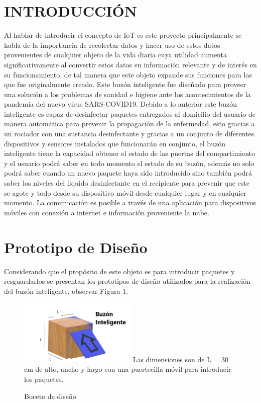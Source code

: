 \documentclass[osajnl,twocolumn,showpacs,superscriptaddress,10pt]{revtex4-1}
\begin{document}
\section{INTRODUCCIÓN}
Al hablar de introducir el concepto de IoT es este proyecto principalmente se habla de la importancia de recolectar datos y hacer uso de estos datos provenientes de cualquier objeto de la vida diaria cuya utilidad aumenta significativamente al convertir estos datos en información relevante y de interés en su funcionamiento, de tal manera que este objeto expande sus funciones para las que fue originalmente creado. Este buzón inteligente fue diseñado para proveer una solución a los problemas de sanidad e higiene ante los acontecimientos de la pandemia del nuevo virus SARS-COVID19. Debido a lo anterior este buzón inteligente es capaz de desinfectar paquetes entregados al domicilio del usuario de manera automática para prevenir la propagación de la enfermedad, esto gracias a un rociador con una sustancia desinfectante y gracias a un conjunto de diferentes dispositivos y sensores instalados que funcionarán en conjunto, el buzón inteligente tiene la capacidad obtener el estado de las puertas del compartimiento y el usuario podrá saber en todo momento el estado de su buzón, además no solo podrá saber cuando un nuevo paquete haya sido introducido sino también podrá saber los niveles del liquido desinfectante en el recipiente para prevenir que este se agote y todo desde su dispositivo móvil desde cualquier lugar y en cualquier momento. La comunicación es posible a través de una aplicación para dispositivos móviles con conexión a internet e información proveniente la nube.

\section{Prototipo de Diseño}
Considerando que el propósito de este objeto es para introducir paquetes y resguardarlos se presentan los prototipos de diseño utilizados para la realización del buzón inteligente, observar Figura 1.


\begin{figure} [H] \centering 
\caption{Boceto de diseño}

\includegraphics[width=0.5\textwidth]{Boceto.png} 
Las dimensiones son de L = 30 cm de alto, ancho y largo con una puertecilla móvil para introducir los paquetes.
\end{figure}
\end{document}
